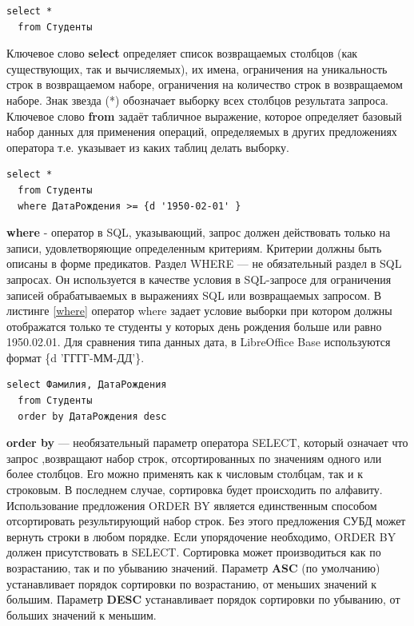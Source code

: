 \documentclass[a4paper]{article}
\begin{document}
\begin{lstlisting}[label=selection,caption=Выборка всех студентов]
  select *
  from Студенты
\end{lstlisting}

Ключевое слово \textbf{select} определяет список возвращаемых столбцов (как существующих, так и вычисляемых), их имена, ограничения на уникальность строк в возвращаемом наборе, ограничения на количество строк в возвращаемом наборе. Знак звезда (*) обозначает выборку всех столбцов результата запроса. Ключевое слово \textbf{from} задаёт табличное выражение, которое определяет базовый набор данных для применения операций, определяемых в других предложениях оператора т.е. указывает из каких таблиц делать выборку.

\newpage
\begin{lstlisting}[label=where, caption=Выборка студентов с датой рождения большей или равной условию]
  select *
  from Студенты
  where ДатаРождения >= {d '1950-02-01' }
\end{lstlisting}

\textbf{where} - оператор в SQL, указывающий, запрос должен действовать только на записи, удовлетворяющие определенным критериям. Критерии должны быть описаны в форме предикатов. Раздел WHERE — не обязательный раздел в SQL запросах. Он используется в качестве условия в SQL-запросе для ограничения записей обрабатываемых в выражениях SQL или возвращаемых запросом. В листинге \ref{where} оператор where задает условие выборки при котором должны отображатся только те студенты у которых день рождения больше или равно 1950.02.01. Для сравнения типа данных дата, в LibreOffice Base используются формат \{d 'ГГГГ-ММ-ДД'\}.

\begin{lstlisting}[label=order, caption=Запрос фамилий и дат рождения студентов отсортированных по дате рождения]
  select Фамилия, ДатаРождения
  from Студенты
  order by ДатаРождения desc
\end{lstlisting}

\textbf{order by} --- необязательный параметр оператора SELECT, который означает что запрос ,возвращают набор строк, отсортированных по значениям одного или более столбцов. Его можно применять как к числовым столбцам, так и к строковым. В последнем случае, сортировка будет происходить по алфавиту. Использование предложения ORDER BY является единственным способом отсортировать результирующий набор строк. Без этого предложения СУБД может вернуть строки в любом порядке. Если упорядочение необходимо, ORDER BY должен присутствовать в SELECT. Сортировка может производиться как по возрастанию, так и по убыванию значений. Параметр \textbf{ASC} (по умолчанию) устанавливает порядок сортировки по возрастанию, от меньших значений к большим. Параметр \textbf{DESC} устанавливает порядок сортировки по убыванию, от больших значений к меньшим.
\end{document}
